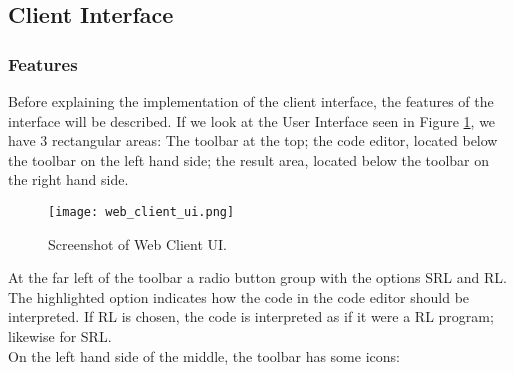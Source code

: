 \subsection*{Client Interface}
%

\subsubsection{Features}
%

Before explaining the implementation of the client interface, the features of the interface will be described.
If we look at the User Interface seen in Figure \ref{fig:web_client_ui}, we have 3 rectangular areas: The toolbar at the top; the code editor, located below the toolbar on the left hand side; the result area, located below the toolbar on the right hand side.

\begin{figure}[H]
  \texttt{[image: web\_client\_ui.png]}
  \caption{Screenshot of Web Client UI.}
  \label{fig:web_client_ui}
\end{figure}

\noindent
At the far left of the toolbar a radio button group with the options SRL and RL. The highlighted option indicates how the code in the code editor should be interpreted. If RL is chosen, the code is interpreted as if it were a RL program; likewise for SRL.\\
On the left hand side of the middle, the toolbar has some icons:\\

